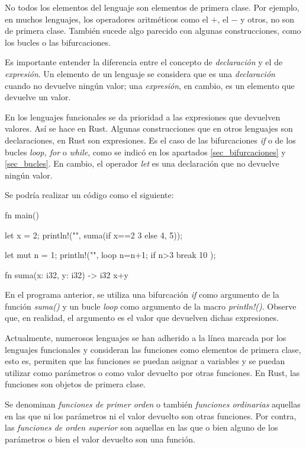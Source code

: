 No todos los elementos del lenguaje son elementos de primera clase. Por ejemplo, en muchos lenguajes, los operadores aritméticos como el $+$, el $-$ y otros, no son de primera clase. También sucede algo parecido con algunas construcciones, como los bucles o las bifurcaciones.

Es importante entender la diferencia entre el concepto de \textit{declaración} y el de \textit{expresión}. Un elemento de un lenguaje se considera que es una \textit{declaración} cuando no devuelve ningún valor; una \textit{expresión}, en cambio, es un elemento que devuelve un valor.

En los lenguajes funcionales se da prioridad a las expresiones que devuelven valores. Así se hace en Rust. Algunas construcciones que en otros lenguajes son declaraciones, en Rust son expresiones. Es el caso de las bifurcaciones \textit{if} o de los bucles \textit{loop, for} o \textit{while}, como se indicó en los apartados \ref{sec_bifurcaciones} y \ref{sec_bucles}. En cambio, el operador \textit{let} es una declaración que no devuelve ningún valor.

Se podría realizar un código como el siguiente:

\vspace{0.7em}
\begin{Codigo}
   fn main() {
      let x = 2;
      println!("{}", suma(if x==2 {3} else {4}, 5));
      
      let mut n = 1;
      println!("{}", loop {
         n=n+1;
         if n>3 {
            break 10
         }
      });
   }
   fn suma(x: i32, y: i32) -> i32 {
      x+y
   }
\end{Codigo}

En el programa anterior, se utiliza una bifurcación \textit{if} como argumento de la función \textit{suma()} y un bucle \textit{loop} como argumento de la macro \textit{println!()}. Observe que, en realidad, el argumento es el valor que devuelven dichas expresiones. 

Actualmente, numerosos lenguajes se han adherido a la línea marcada por los lenguajes funcionales y consideran las funciones como elementos de primera clase, esto es, permiten que las funciones se puedan asignar a variables y se puedan utilizar como parámetros o como valor devuelto por otras funciones. En Rust, las funciones son objetos de primera clase.

Se denominan \textit{funciones de primer orden} o también \textit{funciones ordinarias} aquellas en las que ni los parámetros ni el valor devuelto son otras funciones. Por contra, las \textit{funciones de orden superior} son aquellas en las que o bien alguno de los parámetros o bien el valor devuelto son una función.

